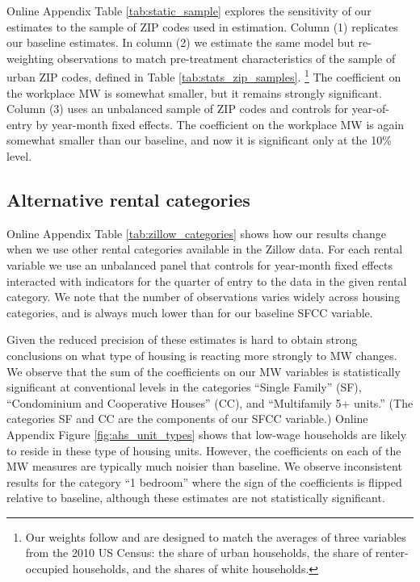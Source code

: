 Online Appendix Table \ref{tab:static_sample} explores the sensitivity of our 
estimates to the sample of ZIP codes used in estimation.
Column (1) replicates our baseline estimates.
In column (2) we estimate the same model but re-weighting observations 
to match pre-treatment characteristics of the sample of urban ZIP codes,
defined in Table \ref{tab:stats_zip_samples}.%
\footnote{Our weights follow \textcite{Hainmueller2012} and are designed to 
    match the averages of three variables from the 2010 US Census:
    the share of urban households,
    the share of renter-occupied households, and
    the shares of white households.}
The coefficient on the workplace MW is somewhat smaller, but it remains 
strongly significant.
Column (3) uses an unbalanced sample of ZIP codes and controls for 
year-of-entry by year-month fixed effects.
The coefficient on the workplace MW is again somewhat smaller than our baseline,
and now it is significant only at the 10\% level.


\subsection{Alternative rental categories}
\label{sec:alternative_categories}

Online Appendix Table \ref{tab:zillow_categories} shows how our results change 
when we use other rental categories available in the Zillow data.
For each rental variable we use an unbalanced panel that controls for
year-month fixed effects interacted with indicators for the quarter of entry
to the data in the given rental category.
We note that the number of observations varies widely across housing categories, 
and is always much lower than for our baseline SFCC variable.

Given the reduced precision of these estimates is hard to obtain strong 
conclusions on what type of housing is reacting more strongly to MW changes.
We observe that the sum of the coefficients on our MW variables is 
statistically significant at conventional levels in the categories 
``Single Family'' (SF),  ``Condominium and Cooperative Houses'' (CC), and 
``Multifamily 5+ units.''
(The categories SF and CC are the components of our SFCC variable.)
Online Appendix Figure \ref{fig:ahs_unit_types} shows that low-wage households 
are likely to reside in these type of housing units.
However, the coefficients on each of the MW measures are typically much noisier 
than baseline.
We observe inconsistent results for the category ``1 bedroom'' where the sign 
of the coefficients is flipped relative to baseline, although these estimates 
are not statistically significant.


